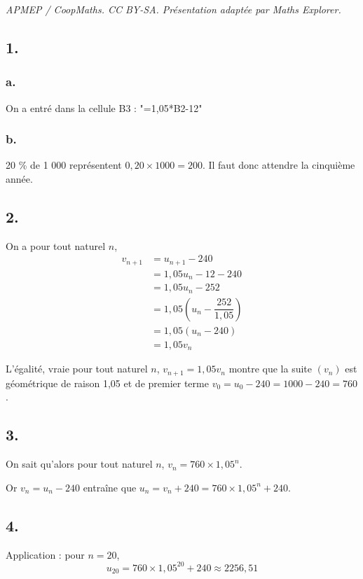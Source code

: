 \documentclass[10pt]{article}
\begin{document}
\noindent\textit{APMEP / CoopMaths. CC BY-SA. Présentation adaptée par Maths Explorer.}\par\medskip
\subsection*{1.}
	
	\subsubsection*{a.}
	
	On a entré dans la cellule B3 : "=1,05*B2-12"
	
	\subsubsection*{b.}
	
	20 \% de 1 000 représentent \(0,20 \times 1000 = 200\). Il faut donc attendre la cinquième année.
	

	\subsection*{2.}
	
	On a pour tout naturel \(n\),
\begin{align*}
			v_{n+1}& = u_{n+1} - 240\\
			& = 1,05u_n - 12 - 240 \\
			&= 1,05u_n - 252 \\
			&= 1,05(u_n - \dfrac{252}{1,05}) \\
			&= 1,05(u_n - 240) \\
			&= 1,05v_n
\end{align*}

	
	
	L'égalité, vraie pour tout naturel \(n\), \(v_{n+1} = 1,05v_n\) montre que la suite \((v_n)\) est géométrique de raison 1,05 et de premier terme \(v_0 = u_0 - 240 = 1000 - 240 = 760\).
	
	\subsection*{3.}
	
	On sait qu'alors pour tout naturel \(n\), \(v_n = 760 \times 1,05^n\).
	
	Or \(v_n = u_n - 240\) entraîne que \(u_n = v_n + 240 = 760 \times 1,05^n + 240\).
	
	\subsection*{4.}
	
	Application : pour \(n = 20\),
	\[
	u_{20} = 760 \times 1,05^{20} + 240 \approx 2256,51
	\]
\end{document}
